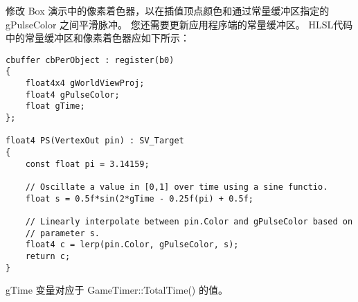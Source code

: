 \begin{flushleft}
修改 Box 演示中的像素着色器，以在插值顶点颜色和通过常量缓冲区指定的 gPulseColor 之间平滑脉冲。 您还需要更新应用程序端的常量缓冲区。 HLSL代码中的常量缓冲区和像素着色器应如下所示：
\end{flushleft}
\begin{lstlisting}
cbuffer cbPerObject : register(b0)
{
    float4x4 gWorldViewProj;
    float4 gPulseColor;
    float gTime;
};

float4 PS(VertexOut pin) : SV_Target
{
    const float pi = 3.14159;

    // Oscillate a value in [0,1] over time using a sine functio.
    float s = 0.5f*sin(2*gTime - 0.25f(pi) + 0.5f;

    // Linearly interpolate between pin.Color and gPulseColor based on
    // parameter s.
    float4 c = lerp(pin.Color, gPulseColor, s);
    return c;
}
\end{lstlisting}
\begin{flushleft}
gTime 变量对应于 GameTimer::TotalTime() 的值。
\end{flushleft}
